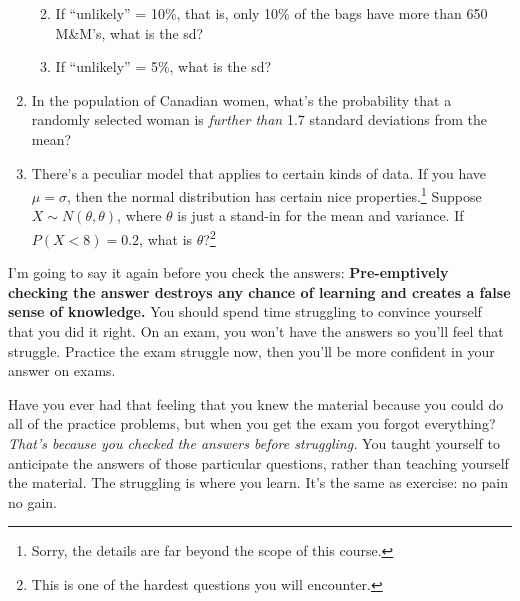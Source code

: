 \documentclass[
  letterpaper,
  DIV=11,
  numbers=noendperiod,
  oneside]{scrreprt}
\providecommand{\tightlist}{%
  \setlength{\itemsep}{0pt}\setlength{\parskip}{0pt}}\usepackage{longtable,booktabs,array}
\begin{document}
\begin{enumerate}
  \begin{enumerate}
  \def\labelenumii{\alph{enumii}.}
  \tightlist
  \item
    If ``unlikely'' = 10\%, that is, only 10\% of the bags have more
    than 650 M\&M's, what is the sd?
  \item
    If ``unlikely'' = 5\%, what is the sd?
  \end{enumerate}
\item
  In the population of Canadian women, what's the probability that a
  randomly selected woman is \emph{further than} 1.7 standard deviations
  from the mean?
\item
  There's a peculiar model that applies to certain kinds of data. If you
  have \(\mu = \sigma\), then the normal distribution has certain nice
  properties.\footnote{Sorry, the details are far beyond the scope of
    this course.} Suppose \(X\sim N(\theta, \theta)\), where \(\theta\)
  is just a stand-in for the mean and variance. If \(P(X < 8) = 0.2\),
  what is \(\theta\)?\footnote{This is one of the hardest questions you
    will encounter.}
\end{enumerate}

I'm going to say it again before you check the answers:
\textbf{Pre-emptively checking the answer destroys any chance of
learning and creates a false sense of knowledge.} You should spend time
struggling to convince yourself that you did it right. On an exam, you
won't have the answers so you'll feel that struggle. Practice the exam
struggle now, then you'll be more confident in your answer on exams.

Have you ever had that feeling that you knew the material because you
could do all of the practice problems, but when you get the exam you
forgot everything? \emph{That's because you checked the answers before
struggling.} You taught yourself to anticipate the answers of those
particular questions, rather than teaching yourself the material. The
struggling is where you learn. It's the same as exercise: no pain no
gain.
\end{document}
